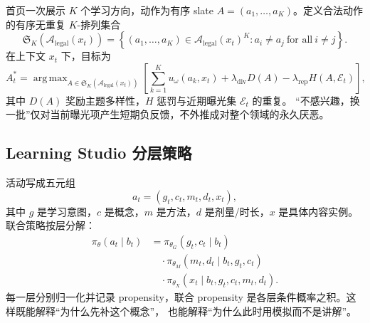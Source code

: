 \documentclass[11pt,a4paper,fontset=none]{ctexart}
\DeclareMathOperator*{\argmax}{arg\,max}
\newcommand{\1}{\mathbb{I}}
\newcommand{\Alegal}{\mathcal{A}_{\mathrm{legal}}}
\begin{document}
首页一次展示 $K$ 个学习方向，动作为有序 slate
$A=(a_1,\ldots,a_K)$。定义合法动作的有序无重复 $K$-排列集合
\begin{equation}
  \mathfrak{S}_K(\Alegal(x_t))=
  \left\{(a_1,\ldots,a_K)\in\Alegal(x_t)^K:
  a_i\ne a_j\ \text{for all}\ i\ne j\right\}.
\end{equation}
在上下文 $x_t$ 下，目标为
\begin{equation}
  A_t^*=\argmax_{A\in\mathfrak{S}_K(\Alegal(x_t))}
  \left[
    \sum_{k=1}^{K}u_\omega(a_k,x_t)
    +\lambda_{\mathrm{div}}D(A)
    -\lambda_{\mathrm{rep}}H(A,\mathcal{E}_t)
  \right],
  \label{eq:slate-objective}
\end{equation}
其中 $D(A)$ 奖励主题多样性，$H$ 惩罚与近期曝光集 $\mathcal{E}_t$ 的重复。
“不感兴趣，换一批”仅对当前曝光项产生短期负反馈，不外推成对整个领域的永久厌恶。

\subsection{Learning Studio 分层策略}

活动写成五元组
\begin{equation}
  a_t=(g_t,c_t,m_t,d_t,x_t),
\end{equation}
其中 $g$ 是学习意图，$c$ 是概念，$m$ 是方法，$d$ 是剂量/时长，$x$ 是具体内容实例。
联合策略按层分解：
\begin{align}
  \pi_\theta(a_t\mid b_t)
  &={}\pi_{\theta_G}(g_t,c_t\mid b_t)\nonumber\\
  &\quad\cdot\pi_{\theta_M}(m_t,d_t\mid b_t,g_t,c_t)\nonumber\\
  &\quad\cdot\pi_{\theta_X}(x_t\mid b_t,g_t,c_t,m_t,d_t).
  \label{eq:hierarchical-policy}
\end{align}
每一层分别归一化并记录 propensity，联合 propensity 是各层条件概率之积。这样既能解释“为什么先补这个概念”，
也能解释“为什么此时用模拟而不是讲解”。
\end{document}

